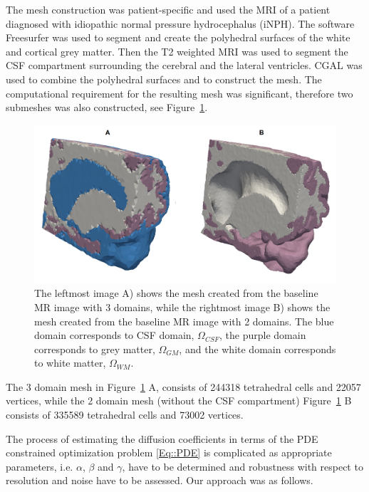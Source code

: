\documentclass[12pt,a4paper]{article}
\begin{document}
The mesh construction was patient-specific and used the MRI of a patient diagnosed with idiopathic normal pressure hydrocephalus (iNPH). The software Freesurfer was used to segment and create the polyhedral surfaces of the white and cortical grey matter. Then the T2 weighted MRI \cite{ringstad2018brain} was used to segment the CSF compartment surrounding the cerebral and the lateral ventricles. CGAL \cite{cgal:rty-m3-18b} was used to combine the polyhedral surfaces and to construct the mesh. The computational requirement for the resulting mesh was significant, therefore two submeshes was also constructed, see Figure~\ref{Fig::Mesh}.
\begin{figure}
\centering
\includegraphics[scale=0.2]{../mesh.png} 
\caption{The leftmost image A) shows the mesh created from the baseline MR image with 3 domains, while the rightmost image  B) shows the mesh created from the baseline MR image with 2 domains. The blue domain corresponds to CSF domain, $\Omega_{CSF}$, the purple domain corresponds to grey matter,  $\Omega_{GM}$, and the white domain corresponds to white matter, $\Omega_{WM}$. }
\label{Fig::Mesh}
\end{figure}
The 3 domain mesh in Figure~\ref{Fig::Mesh} A, consists of 244318 tetrahedral cells and 22057 vertices, while the 2 domain mesh (without the CSF compartment) Figure~\ref{Fig::Mesh} B consists of 335589 tetrahedral cells and 73002 vertices. 

The process of estimating the diffusion coefficients in terms of the PDE constrained optimization problem \eqref{Eq::PDE} is complicated as appropriate parameters, i.e. $\alpha$, $\beta$ and $\gamma$,  have 
to be determined and robustness with respect to resolution and noise have to be assessed. Our approach was as follows. 
\end{document}
